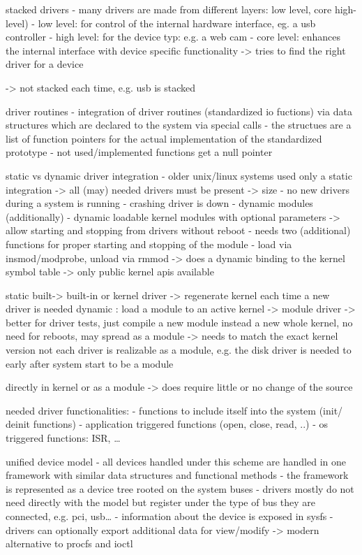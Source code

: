 \cite{quade2016Linux}
stacked drivers
- many drivers are made from different layers: low level, core high-level)
- low level: for control of the internal hardware interface, eg. a usb controller
- high level: for the device typ: e.g. a web cam
- core level: enhances the internal interface with device specific functionality -> tries to find the right driver for a device

\cite{lfd430}
-> not stacked each time, e.g. usb is stacked


driver routines
- integration of driver routines  (standardized io fuctions) via data structures which are declared to the system via special calls
- the structues are a list of function pointers for the actual implementation of the standardized prototype
- not used/implemented functions get a null pointer


static vs dynamic driver integration
- older unix/linux systems used only a static integration -> all (may) needed drivers must be present -> size
    - no new drivers during a system is running
    - crashing driver is down
- dynamic modules (additionally) 
    - dynamic loadable kernel modules with optional parameters -> allow starting and stopping from drivers without reboot
    - needs two (additional) functions for proper starting and stopping of the module
    - load via insmod/modprobe, unload via rmmod -> does a dynamic binding to the kernel symbol table -> only public kernel apis available

\cite{quade2016Linux}
    static built-> built-in or kernel driver -> regenerate kernel each time a new driver is needed
    dynamic : load a module to an active kernel -> module driver -> better for driver tests, just compile a new module instead a new whole kernel, no need for reboots, may spread as a module -> needs to match the exact kernel version
    not each driver is realizable as a module, e.g. the disk driver is needed to early after system start to be a module

\cite{lfd430}
directly in kernel or as a module -> does require little or no change of the source

\cite{quade2016Linux}
needed driver functionalities: 
- functions to include itself into the system (init/ deinit functions)
- application triggered functions (open, close, read, ..)
- os triggered functions: ISR, \ldots

\cite{lfd430}
unified device model
- all devices handled under this scheme are handled in one framework with similar data structures and functional methods
- the framework is represented as a device tree rooted on the system buses
- drivers mostly do not need directly with the model but register under the type of bus they are connected, e.g. pci, usb\ldots
- information about the device is exposed in sysfs
- drivers can optionally export additional data for view/modify -> modern alternative to procfs and ioctl

